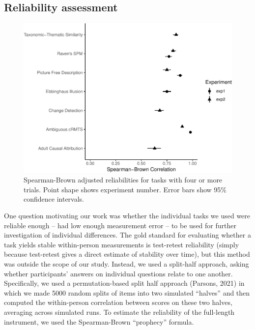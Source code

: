 \documentclass[
  man,floatsintext]{apa6}
\begin{document}
\hypertarget{reliability-assessment}{%
\subsection{Reliability assessment}\label{reliability-assessment}}

\begin{figure}
\centering
\includegraphics{CCRR_manuscript_files/figure-latex/reliability-1.pdf}
\caption{\label{fig:reliability}Spearman-Brown adjusted reliabilities for tasks with four or more trials. Point shape shows experiment number. Error bars show 95\% confidence intervals.}
\end{figure}

One question motivating our work was whether the individual tasks we used were reliable enough -- had low enough measurement error -- to be used for further investigation of individual differences. The gold standard for evaluating whether a task yields stable within-person measurements is test-retest reliability (simply because test-retest gives a direct estimate of stability over time), but this method was outside the scope of our study. Instead, we used a split-half approach, asking whether participants' answers on individual questions relate to one another. Specifically, we used a permutation-based split half approach (Parsons, 2021) in which we made 5000 random splits of items into two simulated ``halves'' and then computed the within-person correlation between scores on these two halves, averaging across simulated runs. To estimate the reliability of the full-length instrument, we used the Spearman-Brown ``prophecy'' formula.
\end{document}
